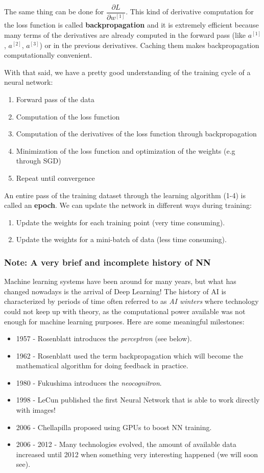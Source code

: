 The same thing can be done for $\dfrac{\partial L}{\partial w^{[1]}}$. This kind of derivative computation for the loss function is called \textbf{backpropagation} and it is extremely efficient because many terms of the derivatives are already computed in the forward pass (like $a^{[1]}$, $a^{[2]}$, $a^{[3]}$) or in the previous derivatives. Caching them makes backpropagation computationally convenient. 

With that said, we have a pretty good understanding of the training cycle of a neural network: 
\begin{enumerate}
    \item Forward pass of the data
    \item Computation of the loss function
    \item Computation of the derivatives of the loss function through backpropagation
    \item Minimization of the loss function and optimization of the weights (e.g through SGD)
    \item Repeat until convergence
\end{enumerate}
An entire pass of the training dataset through the learning algorithm (1-4) is called an \textbf{epoch}.
We can update the network in different ways during training:
\begin{enumerate}
    \item Update the weights for each training point (very time consuming).
    \item Update the weights for a mini-batch of data (less time consuming).
\end{enumerate}

\hrulefill

\subsubsection{Note: A very brief and incomplete history of NN}
Machine learning systems have been around for many years, but what has changed nowadays is the arrival of Deep Learning! The history of AI is characterized by periods of time often referred to as \textit{AI winters} where technology could not keep up with theory, as the computational power available was not enough for machine learning purposes.  Here are some meaningful milestones:
\begin{itemize}
    \item[-] 1957 - Rosenblatt introduces the \textit{perceptron} (see below).
    \item[-] 1962 - Rosenblatt used the term backpropagation which will become the mathematical algorithm for doing feedback in practice.
    \item[-] 1980 - Fukushima introduces the \textit{neocognitron}.
    \item[-] 1998 - LeCun published the first Neural Network that is able to work directly with images!
    \item[-] 2006 - Chellapilla proposed using GPUs to boost NN training.
    \item[-] 2006 - 2012 - Many technologies evolved, the amount of available data increased until 2012 when something very interesting happened (we will soon see).
\end{itemize}
\hrulefill

